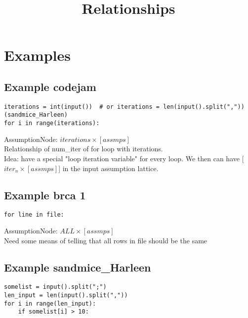 \documentclass[11pt]{article}
\begin{document}
\title{Relationships}

\maketitle


\section{Examples}


\subsection{Example codejam}
\begin{lstlisting}
iterations = int(input())  # or iterations = len(input().split(",")) (sandmice_Harleen)
for i in range(iterations):  
\end{lstlisting}


AssumptionNode: $iterations \times [assmps]$\\

Relationship of num\_iter of for loop with iterations. \\
Idea: have a special "loop iteration variable" for every loop. We then can have [$iter_n\times[assmps]$] in the input assumption lattice. \\



\subsection{Example brca 1}
\begin{lstlisting}
for line in file:
\end{lstlisting}


AssumptionNode: $ALL \times [assmps]$\\

Need some means of telling that all rows in file should be the same\\


\subsection{Example sandmice\_Harleen}
\begin{lstlisting}
somelist = input().split(";")
len_input = len(input().split(","))
for i in range(len_input):
    if somelist[i] > 10:
\end{lstlisting}
\end{document}
